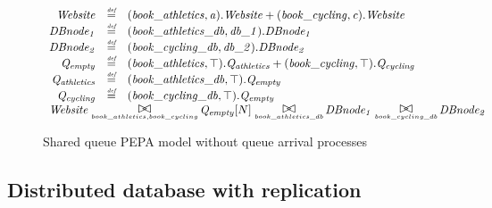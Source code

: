 \begin{figure}
	\caption{Shared queue PEPA model without queue arrival processes}
	\centering
	\begin{displaymath}
	\begin{array}{rcl}
	\mathit{Website} & \rmdef & (\mathit{book\_athletics},\mathit{a}).\mathit{Website}+(\mathit{book\_cycling},\mathit{c}).\mathit{Website}\\
	\mathit{DBnode_1} & \rmdef & (\mathit{book\_athletics\_db},\mathit{db\_1}).\mathit{DBnode_1}\\
	\mathit{DBnode_2} & \rmdef & (\mathit{book\_cycling\_db},\mathit{db\_2}).\mathit{DBnode_2}\\
	\mathit{Q_{empty}} & \rmdef & (\mathit{book\_athletics},\top).\mathit{Q_{athletics}}+(\mathit{book\_cycling},\top).\mathit{Q_{cycling}}\\
	\mathit{Q_{athletics}} & \rmdef & (\mathit{book\_athletics\_db},\top).\mathit{Q_{empty}}\\
	\mathit{Q_{cycling}} & \rmdef & (\mathit{book\_cycling\_db},\top).\mathit{Q_{empty}}\\
	[0.0ex]		\multicolumn{3}{l}{\mathit{Website}\sync{book\_athletics,book\_cycling}\mathit{Q_{empty}}[N]\sync{book\_athletics\_db}\mathit{DBnode_1}\sync{book\_cycling\_db}\mathit{DBnode_2}}\\
	[0.0ex]	\end{array}
	\end{displaymath}
\end{figure}

%
%
\subsection{Distributed database with replication}

